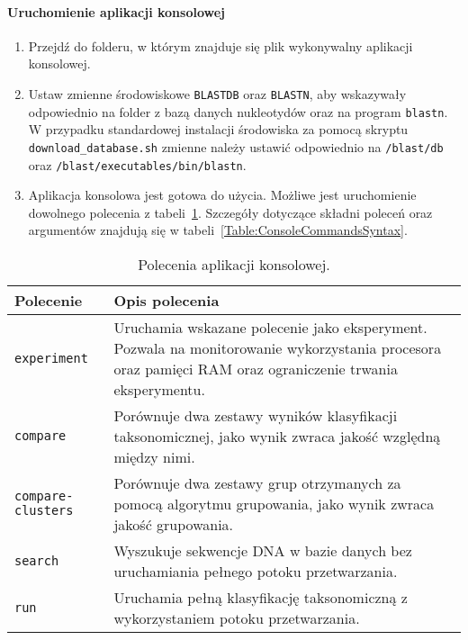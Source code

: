             \paragraph{Uruchomienie aplikacji konsolowej}

                \begin{enumerate}
                    \item {
                        Przejdź do folderu, w którym znajduje się plik wykonywalny aplikacji konsolowej.
                    }
                    \item {
                        Ustaw zmienne środowiskowe \texttt{BLASTDB} oraz \texttt{BLASTN}, aby wskazywały odpowiednio na folder z bazą danych nukleotydów oraz na program \texttt{blastn}. 
                        W przypadku standardowej instalacji środowiska za pomocą skryptu \texttt{download\_database.sh} zmienne należy ustawić odpowiednio na \texttt{/blast/db} oraz \texttt{/blast/executables/bin/blastn}.
                    }
                    \item {
                        Aplikacja konsolowa jest gotowa do użycia. Możliwe jest uruchomienie dowolnego polecenia z tabeli~\ref{Table:ConsoleCommands}. Szczegóły dotyczące składni poleceń oraz argumentów znajdują się w tabeli~\ref{Table:ConsoleCommandsSyntax}.
                    }
                \end{enumerate}

                \begin{table}[!ht] \centering
                    \caption{Polecenia aplikacji konsolowej.}\label{Table:ConsoleCommands}

                    \begin{tabularx}{\textwidth}{| >{\footnotesize}m{} |  >{\footnotesize}X |} 
                        \hline
                        \textbf{\normalsize Polecenie}  & \textbf{\normalsize Opis polecenia} \\ \hline \hline
                        \texttt{experiment} 	        & Uruchamia wskazane polecenie jako eksperyment. Pozwala na monitorowanie wykorzystania procesora oraz pamięci RAM oraz ograniczenie trwania eksperymentu. \\ \hline
                        \texttt{compare}		        & Porównuje dwa zestawy wyników klasyfikacji taksonomicznej, jako wynik zwraca jakość względną między nimi. \\ \hline
                        \texttt{compare-clusters} 	    & Porównuje dwa zestawy grup otrzymanych za pomocą algorytmu grupowania, jako wynik zwraca jakość grupowania. \\ \hline
                        \texttt{search}                 & Wyszukuje sekwencje DNA w bazie danych bez uruchamiania pełnego potoku przetwarzania. \\ \hline
                        \texttt{run}		            & Uruchamia pełną klasyfikację taksonomiczną z wykorzystaniem potoku przetwarzania. \\ \hline
                    \end{tabularx}
                
                \end{table}

